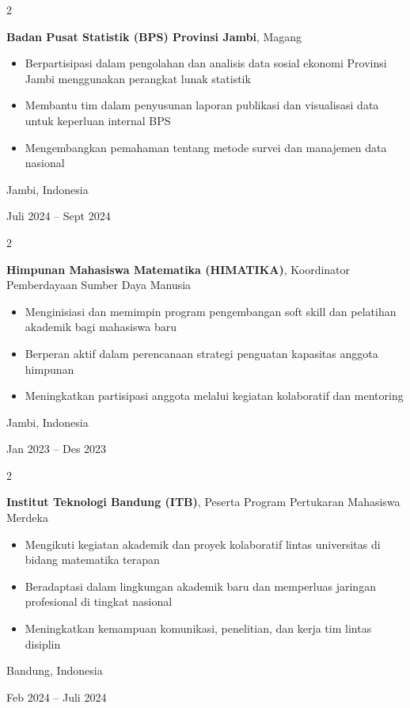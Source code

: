 \documentclass[10pt, letterpaper]{article}
\newenvironment{highlights}{
    \begin{itemize}[
        topsep=0.10 cm,
        parsep=0.10 cm,
        partopsep=0pt,
        itemsep=0pt,
        leftmargin=0.4 cm + 10pt
    ]
}{
    \end{itemize}
} %
\newenvironment{twocolentry}[2][]{
    \onecolentry
    \def\secondColumn{#2}
    \setcolumnwidth{\fill, 4.5 cm}
    \begin{paracol}{2}
}{
    \switchcolumn \raggedleft \secondColumn
    \end{paracol}
    \endonecolentry
} %
\begin{document}
\begin{twocolentry}{
    Jambi, Indonesia

    Juli 2024 – Sept 2024
}
    \textbf{Badan Pusat Statistik (BPS) Provinsi Jambi}, Magang
    \begin{highlights}
        \item Berpartisipasi dalam pengolahan dan analisis data sosial ekonomi Provinsi Jambi menggunakan perangkat lunak statistik
        \item Membantu tim dalam penyusunan laporan publikasi dan visualisasi data untuk keperluan internal BPS
        \item Mengembangkan pemahaman tentang metode survei dan manajemen data nasional
    \end{highlights}
\end{twocolentry}

\vspace{0.2 cm}

\begin{twocolentry}{
    Jambi, Indonesia

    Jan 2023 – Des 2023
}
    \textbf{Himpunan Mahasiswa Matematika (HIMATIKA)}, Koordinator Pemberdayaan Sumber Daya Manusia
    \begin{highlights}
        \item Menginisiasi dan memimpin program pengembangan soft skill dan pelatihan akademik bagi mahasiswa baru
        \item Berperan aktif dalam perencanaan strategi penguatan kapasitas anggota himpunan
        \item Meningkatkan partisipasi anggota melalui kegiatan kolaboratif dan mentoring
    \end{highlights}
\end{twocolentry}

\vspace{0.2 cm}

\begin{twocolentry}{
    Bandung, Indonesia

    Feb 2024 – Juli 2024
}
    \textbf{Institut Teknologi Bandung (ITB)}, Peserta Program Pertukaran Mahasiswa Merdeka
    \begin{highlights}
        \item Mengikuti kegiatan akademik dan proyek kolaboratif lintas universitas di bidang matematika terapan
        \item Beradaptasi dalam lingkungan akademik baru dan memperluas jaringan profesional di tingkat nasional
        \item Meningkatkan kemampuan komunikasi, penelitian, dan kerja tim lintas disiplin
    \end{highlights}
\end{twocolentry}
\end{document}
